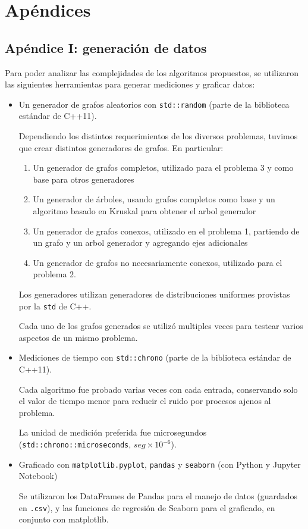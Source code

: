 \section{Apéndices}
	\subsection{Apéndice I: generación de datos}
	Para poder analizar las complejidades de los algoritmos propuestos, se utilizaron las siguientes herramientas para generar mediciones y graficar datos:

	\begin{itemize}
		\item Un generador de grafos aleatorios con \texttt{std::random} (parte de la biblioteca estándar de C++11).

		Dependiendo los distintos requerimientos de los diversos problemas, tuvimos que crear distintos generadores de grafos. En particular:

		\begin{enumerate}
			\item Un generador de grafos completos, utilizado para el problema 3 y como base para otros generadores
			\item Un generador de árboles, usando grafos completos como base y un algoritmo basado en Kruskal para obtener el arbol generador
			\item Un generador de grafos conexos, utilizado en el problema 1, partiendo de un grafo y un arbol generador y agregando ejes adicionales
			\item Un generador de grafos no necesariamente conexos, utilizado para el problema 2.
		\end{enumerate}

		Los generadores utilizan generadores de distribuciones uniformes provistas por la \texttt{std} de C++.

		Cada uno de los grafos generados se utilizó multiples veces para testear varios aspectos de un mismo problema.

		\item Mediciones de tiempo con \texttt{std::chrono} (parte de la biblioteca estándar de C++11).

		Cada algoritmo fue probado varias veces con cada entrada, conservando solo el valor de tiempo menor para reducir el ruido por procesos ajenos al problema.

		La unidad de medición preferida fue microsegundos (\texttt{std::chrono::microseconds}, $seg \times 10^{-6}$).

		\item Graficado con \texttt{matplotlib.pyplot}, \texttt{pandas} y \texttt{seaborn} (con Python y Jupyter Notebook)

		Se utilizaron los DataFrames de Pandas para el manejo de datos (guardados en \texttt{.csv}), y las funciones de regresión de Seaborn para el graficado, en conjunto con matplotlib.

	\end{itemize}


